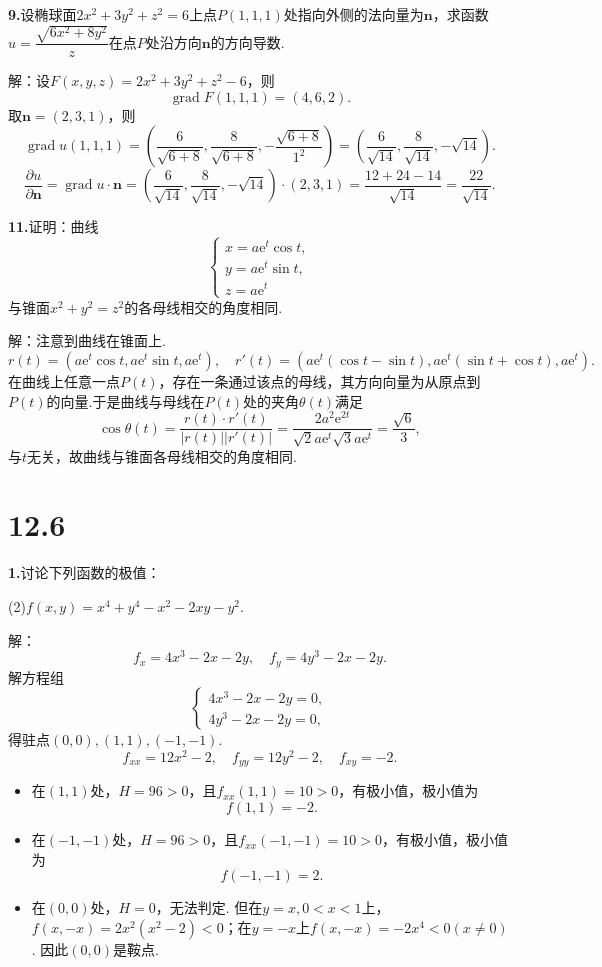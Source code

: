 \documentclass[12pt, a4paper]{article}
\newcommand{\e}{\mathrm{e}}
\begin{document}
\textbf{9.}设椭球面\(2x^2 + 3y^2 + z^2 = 6\)上点\(P(1, 1, 1)\)处指向外侧的法向量为\(\bm{n}\)，求函数\(u = \dfrac{\sqrt{6x^2 + 8y^2}}{z}\)在点\(P\)处沿方向\(\bm{n}\)的方向导数.

解：设\(F(x, y, z) = 2x^2 + 3y^2 + z^2 - 6\)，则
\[\operatorname{grad} F(1, 1, 1) = (4, 6, 2).\]
取\(\bm{n} = (2, 3, 1)\)，则
\[\operatorname{grad} u(1, 1, 1) = \left(\frac{6}{\sqrt{6 + 8}}, \frac{8}{\sqrt{6 + 8}}, -\frac{\sqrt{6 + 8}}{1^2}\right) = \left(\frac{6}{\sqrt{14}}, \frac{8}{\sqrt{14}}, -\sqrt{14}\right).\]
\[\frac{\partial u}{\partial \bm{n}} = \operatorname{grad} u \cdot \bm{n} = \left(\frac{6}{\sqrt{14}}, \frac{8}{\sqrt{14}}, -\sqrt{14}\right) \cdot (2, 3, 1) = \frac{12 + 24 - 14}{\sqrt{14}} = \frac{22}{\sqrt{14}}.\]

\textbf{11.}证明：曲线
\[\begin{cases}
x = a\e^t \cos t, \\
y = a\e^t \sin t, \\
z = a\e^t
\end{cases}\]
与锥面\(x^2 + y^2 = z^2\)的各母线相交的角度相同.

解：注意到曲线在锥面上.
\[r(t) = (a\e^t \cos t, a\e^t \sin t, a\e^t), \quad r'(t) = \left(a\e^t(\cos t - \sin t), a\e^t(\sin t + \cos t), a\e^t\right).\]
在曲线上任意一点\(P(t)\)，存在一条通过该点的母线，其方向向量为从原点到\(P(t)\)的向量.于是曲线与母线在\(P(t)\)处的夹角\(\theta(t)\)满足
\[\cos \theta(t) = \frac{r(t) \cdot r'(t)}{|r(t)||r'(t)|} = \frac{2a^2 \e^{2t}}{\sqrt{2} a \e^{t} \sqrt{3} a \e^{t}} = \frac{\sqrt{6}}{3},\]
与\(t\)无关，故曲线与锥面各母线相交的角度相同.

\section*{12.6}
\textbf{1.}讨论下列函数的极值：

(2)\(f(x, y) = x^4 + y^4 - x^2 - 2xy - y^2.\)

解：\[f_x = 4x^3 - 2x - 2y, \quad f_y = 4y^3 - 2x - 2y.\]
解方程组
\[\begin{cases}
4x^3 - 2x - 2y = 0, \\
4y^3 - 2x - 2y = 0,
\end{cases}\]
得驻点\((0, 0), (1, 1), (-1, -1)\).
\[f_{xx} = 12x^2 - 2, \quad f_{yy} = 12y^2 - 2, \quad f_{xy} = -2.\]
\begin{itemize}
\item 在\((1, 1)\)处，\(H =  96 > 0\)，且\(f_{xx}(1, 1) = 10 > 0\)，有极小值，极小值为
\[f(1, 1) = -2.\]
\item 在\((-1, -1)\)处，\(H =  96 > 0\)，且\(f_{xx}(-1, -1) = 10 > 0\)，有极小值，极小值为
\[f(-1, -1) = 2.\]
\item 在\((0, 0)\)处，\(H =  0\)，无法判定. 但在\(y = x, 0 < x < 1\)上，\(f(x, -x) = 2x^2(x^2 - 2) < 0\)；在\(y = -x\)上\(f(x, -x) = -2x^4 < 0(x \neq 0)\). 因此\((0, 0)\)是鞍点.
\end{itemize}
\end{document}
